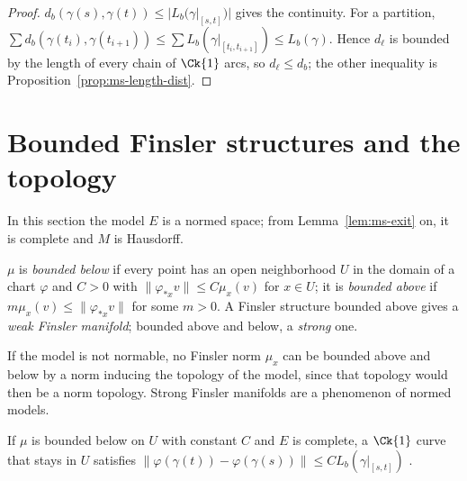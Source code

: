 \begin{proof}
  \leanok
  $d_b(\gamma(s), \gamma(t)) \leq |L_b(\gamma|_{[s, t]})|$ gives the continuity. For a partition,
  $\sum d_b(\gamma(t_i), \gamma(t_{i+1})) \leq \sum L_b(\gamma|_{[t_i, t_{i+1}]}) \leq L_b(\gamma)$.
  Hence $d_\ell$ is bounded by the length of every chain of $\Ck{1}$ arcs, so $d_\ell \leq d_b$;
  the other inequality is Proposition~\ref{prop:ms-length-dist}.
\end{proof}

\section{Bounded Finsler structures and the topology}
\label{sec:ms-bounded}

In this section the model $E$ is a normed space; from Lemma~\ref{lem:ms-exit} on, it is complete
and $M$ is Hausdorff.

\begin{definition}
  \label{def:ms-bounded}
  \leanok
  $\mu$ is \emph{bounded below} if every point has an open neighborhood $U$ in the domain of a
  chart $\varphi$ and $C > 0$ with $\|\varphi_{*x} v\| \leq C \mu_x(v)$ for $x \in U$; it is
  \emph{bounded above} if $m \mu_x(v) \leq \|\varphi_{*x} v\|$ for some $m > 0$. A Finsler
  structure bounded above gives a \emph{weak Finsler manifold}; bounded above and below, a
  \emph{strong} one.
\end{definition}

\begin{remark}
  If the model is not normable, no Finsler norm $\mu_x$ can be bounded above and below by a norm
  inducing the topology of the model, since that topology would then be a norm topology. Strong
  Finsler manifolds are a phenomenon of normed models.
\end{remark}

\begin{lemma}
  \label{lem:ms-integrated}
  \leanok
  If $\mu$ is bounded below on $U$ with constant $C$ and $E$ is complete, a $\Ck{1}$ curve that
  stays in $U$ satisfies $\|\varphi(\gamma(t)) - \varphi(\gamma(s))\| \leq C L_b(\gamma|_{[s, t]})$
  \cite[(9.2)]{Lar26}.
\end{lemma}


